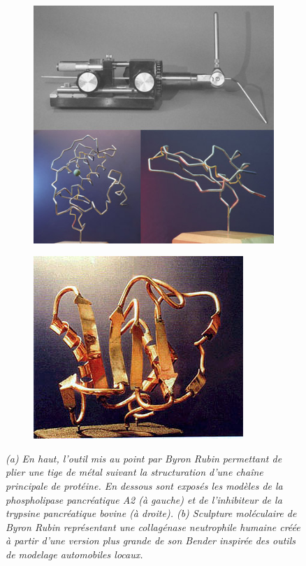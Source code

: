 \begin{figure}
  \begin{subfigure}{.5\textwidth}
  \centering
  {\includegraphics[width=0.9\linewidth]{./figures/ch1/bender_tool_models}}
    \label{Fig:bender_tool_models}
  \caption{}
  \end{subfigure}%
  \begin{subfigure}{.5\textwidth}
  \centering
  {\includegraphics[width=0.9\linewidth]{./figures/ch1/byron_sculpture_colagenase}}    
    \label{Fig:byron_rubin_art}
  \caption{}
  \hspace{0.2cm}
  \end{subfigure}%
 \caption{\it (a) En haut, l'outil mis au point par Byron Rubin permettant de plier une tige de métal suivant la structuration d'une chaîne principale de protéine. En dessous sont exposés les modèles de la phospholipase pancréatique A2 (à gauche) et de l'inhibiteur de la trypsine pancréatique bovine (à droite).
  (b) Sculpture moléculaire de Byron Rubin représentant une collagénase neutrophile humaine créée à partir d'une version plus grande de son Bender inspirée des outils de modelage automobiles locaux.}
\end{figure}

